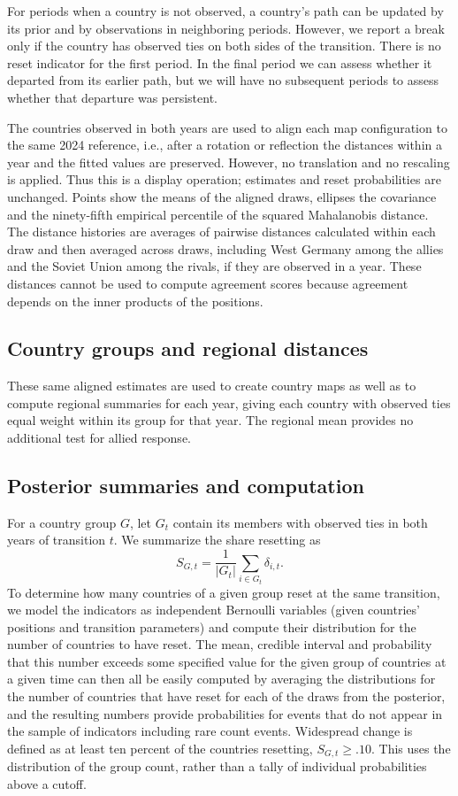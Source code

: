 \documentclass[10pt,authoryear]{elsarticle}
\begin{document}
For periods when a country is not observed, a country’s path can be updated by its prior and by observations in neighboring periods. However, we report a break only if the country has observed ties on both sides of the transition. There is no reset indicator for the first period. In the final period we can assess whether it departed from its earlier path, but we will have no subsequent periods to assess whether that departure was persistent.

The countries observed in both years are used to align each map configuration to the same 2024 reference, i.e., after a rotation or reflection the distances within a year and the fitted values are preserved. However, no translation and no rescaling is applied. Thus this is a display operation; estimates and reset probabilities are unchanged. Points show the means of the aligned draws, ellipses the covariance and the ninety-fifth empirical percentile of the squared Mahalanobis distance. The distance histories are averages of pairwise distances calculated within each draw and then averaged across draws, including West Germany among the allies and the Soviet Union among the rivals, if they are observed in a year. These distances cannot be used to compute agreement scores because agreement depends on the inner products of the positions.

\subsection{Country groups and regional distances}

These same aligned estimates are used to create country maps as well as to compute regional summaries for each year, giving each country with observed ties equal weight within its group for that year. The regional mean provides no additional test for allied response.

\subsection{Posterior summaries and computation}

For a country group $G$, let $G_t$ contain its members with observed ties in both years of transition $t$. We summarize the share resetting as
\[
S_{G,t}=\frac{1}{|G_t|}\sum_{i\in G_t}\delta_{i,t}.
\]
To determine how many countries of a given group reset at the same transition, we model the indicators as independent Bernoulli variables (given countries’ positions and transition parameters) and compute their distribution for the number of countries to have reset. The mean, credible interval and probability that this number exceeds some specified value for the given group of countries at a given time can then all be easily computed by averaging the distributions for the number of countries that have reset for each of the draws from the posterior, and the resulting numbers provide probabilities for events that do not appear in the sample of indicators including rare count events. Widespread change is defined as at least ten percent of the countries resetting, $S_{G,t}\geq .10$. This uses the distribution of the group count, rather than a tally of individual probabilities above a cutoff.
\end{document}
